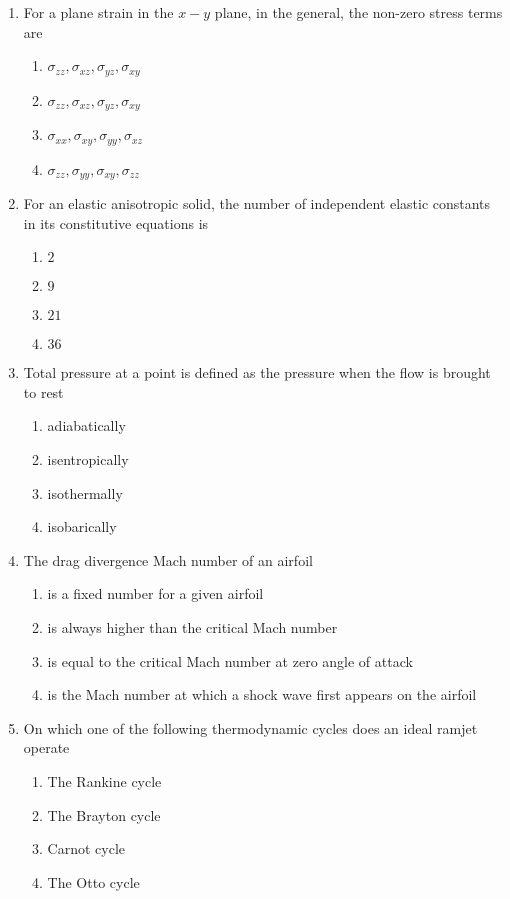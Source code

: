 \documentclass[journal]{IEEEtran}
\begin{document}
\begin{enumerate}
    \item For a plane strain in the $x-y$ plane, in the general, the non-zero stress terms are 
    \begin{enumerate}
        \item $\sigma_{zz} , \sigma_{xz}, \sigma_{yz}, \sigma_{xy}$
        \item $\sigma_{zz} , \sigma_{xz}, \sigma_{yz}, \sigma_{xy}$
        \item $\sigma_{xx} , \sigma_{xy}, \sigma_{yy}, \sigma_{xz}$
        \item $\sigma_{zz} , \sigma_{yy}, \sigma_{xy}, \sigma_{zz}$
    \end{enumerate}

    \item For an elastic anisotropic solid, the number of independent elastic constants in its constitutive equations is 
    \begin{enumerate}
        \item $2$
        \item $9$
        \item $21$
        \item $36$
    \end{enumerate}

    \item Total pressure at a point is defined as the pressure when the flow is brought to rest 
    \begin{enumerate}
        \item adiabatically
        \item isentropically
        \item isothermally
        \item isobarically \\
    \end{enumerate}

    \item The drag divergence Mach number of an airfoil
    \begin{enumerate}
        \item is a fixed number for a given airfoil
        \item is always higher than the critical Mach number 
        \item is equal to the critical Mach number at zero angle of attack
        \item is the Mach number at which a shock wave first appears on the airfoil\\
    \end{enumerate}

    \item On which one of the following thermodynamic cycles does an ideal ramjet operate
    \begin{enumerate}
        \item The Rankine cycle 
        \item The Brayton cycle
        \item Carnot cycle
        \item The Otto cycle\\
    \end{enumerate}
 
\end{enumerate}
\end{document}
